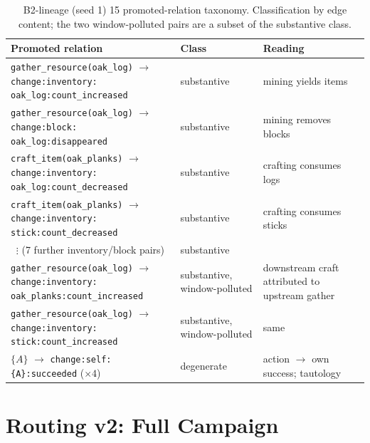 \documentclass[10pt,a4paper]{article}
\begin{document}
\begin{table}[h]
\centering\small
\caption{B2-lineage (seed 1) 15 promoted-relation taxonomy. Classification by edge content; the two window-polluted pairs are a subset of the substantive class.}
\label{tab:taxonomy}
\begin{tabular}{L{6.6cm}L{2.2cm}L{5.2cm}}
\toprule
\textbf{Promoted relation} & \textbf{Class} & \textbf{Reading} \\
\midrule
\texttt{gather\_resource(oak\_log)} $\rightarrow$ \texttt{change:inventory:\newline oak\_log:count\_increased} & substantive & mining yields items \\
\texttt{gather\_resource(oak\_log)} $\rightarrow$ \texttt{change:block:\newline oak\_log:disappeared} & substantive & mining removes blocks \\
\texttt{craft\_item(oak\_planks)} $\rightarrow$ \texttt{change:inventory:\newline oak\_log:count\_decreased} & substantive & crafting consumes logs \\
\texttt{craft\_item(oak\_planks)} $\rightarrow$ \texttt{change:inventory:\newline stick:count\_decreased} & substantive & crafting consumes sticks \\
$\;\;\vdots$ (7 further inventory/block pairs) & substantive & \\
\midrule
\texttt{gather\_resource(oak\_log)} $\rightarrow$ \texttt{change:inventory:\newline oak\_planks:count\_increased} & substantive, window-polluted & downstream craft attributed to upstream gather \\
\texttt{gather\_resource(oak\_log)} $\rightarrow$ \texttt{change:inventory:\newline stick:count\_increased} & substantive, window-polluted & same \\
\midrule
\texttt{$\{A\}$} $\rightarrow$ \texttt{change:self:\{A\}:succeeded} ($\times 4$) & degenerate & action $\rightarrow$ own success; tautology \\
\bottomrule
\end{tabular}
\end{table}

\section{Routing v2: Full Campaign}
\label{app:routing}
\end{document}
